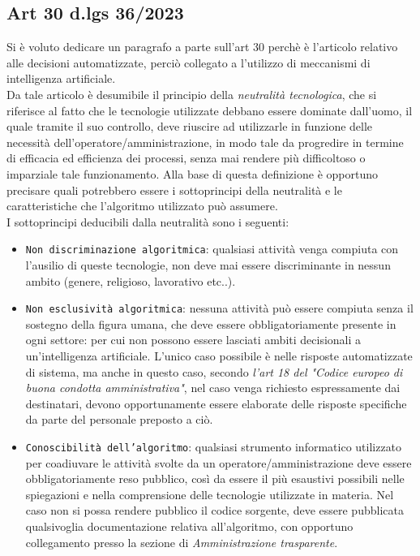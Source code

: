\documentclass{article}
\begin{document}
\subsection{Art 30 d.lgs 36/2023}
\begin{justify}
    Si è voluto dedicare un paragrafo a parte sull'art 30 perchè è l'articolo relativo alle decisioni automatizzate, perciò collegato a l'utilizzo di meccanismi di intelligenza artificiale.\\
    Da tale articolo è desumibile il principio della \textit{neutralità tecnologica}, che si riferisce al fatto che le tecnologie utilizzate debbano essere dominate dall'uomo, il quale tramite il suo controllo, deve riuscire ad utilizzarle in funzione delle necessità dell'operatore/amministrazione, in modo tale da progredire in termine di efficacia ed efficienza dei processi, senza mai rendere più  difficoltoso o imparziale tale funzionamento.
    Alla base di questa definizione è opportuno precisare quali potrebbero essere i sottoprincipi della neutralità e le caratteristiche che l'algoritmo utilizzato può assumere.\\
    I sottoprincipi deducibili dalla neutralità sono i seguenti:
    \begin{itemize}
        \item \texttt{Non discriminazione algoritmica}: qualsiasi attività venga compiuta con l'ausilio di queste tecnologie, non deve mai essere discriminante in nessun ambito (genere, religioso, lavorativo etc..).
        \item \texttt{Non esclusività algoritmica}: nessuna attività può essere compiuta senza il sostegno della figura umana, che deve essere obbligatoriamente presente in ogni settore: per cui non possono essere lasciati ambiti decisionali a un'intelligenza artificiale. L'unico caso possibile è nelle risposte automatizzate di sistema, ma anche in questo caso, secondo \textit{l'art 18 del "Codice europeo di buona condotta amministrativa"}, nel caso venga richiesto espressamente dai destinatari, devono opportunamente essere elaborate delle risposte specifiche da parte del personale preposto a ciò.
        \item \texttt{Conoscibilità dell'algoritmo}: qualsiasi strumento informatico utilizzato per coadiuvare le attività svolte da un operatore/amministrazione deve essere obbligatoriamente reso pubblico, così da essere il più esaustivi possibili nelle spiegazioni e nella comprensione delle tecnologie utilizzate in materia. Nel caso non si possa rendere pubblico il codice sorgente, deve essere pubblicata qualsivoglia documentazione relativa all'algoritmo, con opportuno collegamento presso la sezione di \textit{Amministrazione trasparente}.

\end{itemize}
\end{justify}
\end{document}
